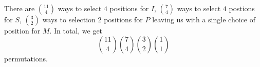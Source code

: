 There are $\binom{11}{4}$ ways to select $4$ positions for $I$, ${7 \choose 4}$ 
ways to select $4$ postions for $S$, ${3 \choose 2}$ ways to selection $2$ 
positions for $P$ leaving us with a single choice of position for $M$. In total, 
we get
\[{11 \choose 4}{7 \choose 4}{3 \choose 2}{1 \choose 1}\] permutations.